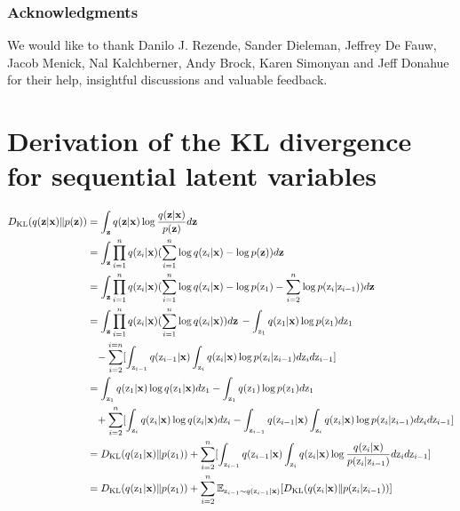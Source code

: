 \documentclass{article} \usepackage{iclr2019_conference,times}
\def\rz{{\textnormal{z}}}
\def\rvx{{\mathbf{x}}}
\def\rvz{{\mathbf{z}}}
\newcommand{\E}{\mathbb{E}}
\newcommand{\KL}{D_{\mathrm{KL}}}
\begin{document}
\subsubsection*{Acknowledgments}
We would like to thank Danilo J. Rezende, 
Sander Dieleman, Jeffrey De Fauw,
Jacob Menick, Nal Kalchberner, Andy Brock, Karen Simonyan and Jeff Donahue for their help, insightful discussions and valuable feedback.





\appendix

\section{Derivation of the KL divergence for sequential latent variables}\label{app:seqkl}

\begin{equation*}
\begin{split}
\KL(q(\rvz|\rvx) \Vert p(\rvz)) &= \int_{\rvz} q(\rvz|\rvx) \log\frac{q(\rvz|\rvx)}{p(\rvz)} d\rvz \\
&= \int_{\rvz} \prod\limits_{i=1}^{n} q(\rz_i|\rvx)(\sum\limits_{i=1}^{n}\log q(\rz_i|\rvx) - \log p(\rvz)) d\rvz \\
& = \int_{\rvz} \prod\limits_{i=1}^{n} q(\rz_i|\rvx) (\sum\limits_{i=1}^{n}\log q(\rz_i|\rvx) - \log p(\rz_1) - \sum\limits_{i=2}^{n}\log p(\rz_i|\rz_{i-1})) d\rvz\\
&= \int_{\rvz} \prod\limits_{i=1}^{n} q(\rz_i|\rvx) (\sum\limits_{i=1}^{n}\log q(\rz_i|\rvx)) d\rvz \, - \int_{\rz_1} q(\rz_1|\rvx)\log p(\rz_1) d\rz_1  \\
& \,\,\,\,\, - \sum\limits_{i=2}^{i=n}[\int_{\rz_{i-1}} q(\rz_{i-1}|\rvx) \int_{\rz_i}  q(\rz_i|\rvx)\log p(\rz_i|\rz_{i-1}) d\rz_{i} d\rz_{i-1}] \\
& = \int_{\rz_1} q(\rz_1|\rvx) \log q(\rz_1|\rvx) d\rz_1 - \int_{\rz_1} q(\rz_1)\log p(\rz_1) d\rz_1  \\
& \,\,\,\,\, + \sum\limits_{i=2}^{n} [\int_{\rz_i} q(\rz_i|\rvx) \log q(\rz_i|\rvx) d\rz_i -
\int_{\rz_{i-1}} q(\rz_{i-1}|\rvx) \int_{\rz_i}  q(\rz_i|\rvx)\log p(\rz_i|\rz_{i-1}) d\rz_{i} d\rz_{i-1}] \\
& = \KL(q(\rz_1|\rvx) \Vert p(\rz_1)) + \sum\limits_{i=2}^{n}[\int_{\rz_{i-1}} q(\rz_{i-1}|\rvx) \int_{\rz_i} q(\rz_i|\rvx) \log\frac{q(\rz_i|\rvx)}{p(\rz_i|\rz_{i-1})} d\rz_i d\rz_{i-1}] \\
& = \KL(q(\rz_1|\rvx) \Vert p(\rz_1)) + \sum\limits_{i=2}^{n}\E_{\rz_{i-1}\sim q(\rz_{i-1}|\rvx)} [\KL(q(\rz_i|\rvx) \Vert p(\rz_i|\rz_{i-1}))] \\
\end{split}
\end{equation*}
\end{document}
